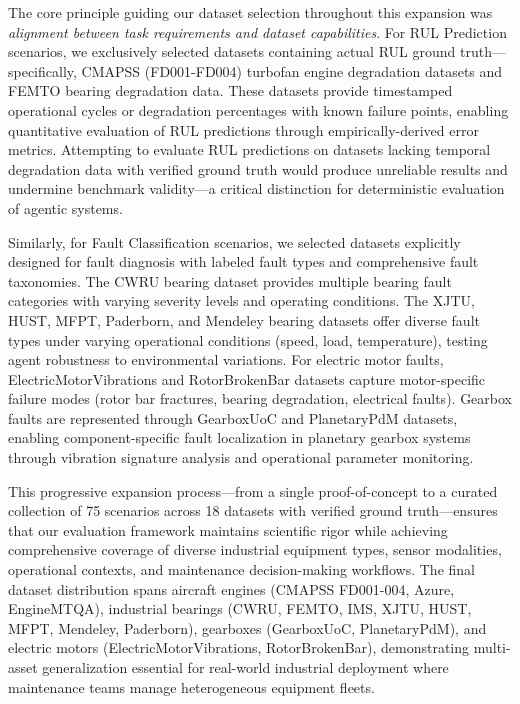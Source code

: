 \documentclass[sigconf]{acmart}
\begin{document}
The core principle guiding our dataset selection throughout this expansion was \textit{alignment between task requirements and dataset capabilities}. For RUL Prediction scenarios, we exclusively selected datasets containing actual RUL ground truth---specifically, CMAPSS (FD001-FD004) turbofan engine degradation datasets and FEMTO bearing degradation data. These datasets provide timestamped operational cycles or degradation percentages with known failure points, enabling quantitative evaluation of RUL predictions through empirically-derived error metrics. Attempting to evaluate RUL predictions on datasets lacking temporal degradation data with verified ground truth would produce unreliable results and undermine benchmark validity---a critical distinction for deterministic evaluation of agentic systems.

Similarly, for Fault Classification scenarios, we selected datasets explicitly designed for fault diagnosis with labeled fault types and comprehensive fault taxonomies. The CWRU bearing dataset provides multiple bearing fault categories with varying severity levels and operating conditions. The XJTU, HUST, MFPT, Paderborn, and Mendeley bearing datasets offer diverse fault types under varying operational conditions (speed, load, temperature), testing agent robustness to environmental variations. For electric motor faults, ElectricMotorVibrations and RotorBrokenBar datasets capture motor-specific failure modes (rotor bar fractures, bearing degradation, electrical faults). Gearbox faults are represented through GearboxUoC and PlanetaryPdM datasets, enabling component-specific fault localization in planetary gearbox systems through vibration signature analysis and operational parameter monitoring.

This progressive expansion process---from a single proof-of-concept to a curated collection of 75 scenarios across 18 datasets with verified ground truth---ensures that our evaluation framework maintains scientific rigor while achieving comprehensive coverage of diverse industrial equipment types, sensor modalities, operational contexts, and maintenance decision-making workflows. The final dataset distribution spans aircraft engines (CMAPSS FD001-004, Azure, EngineMTQA), industrial bearings (CWRU, FEMTO, IMS, XJTU, HUST, MFPT, Mendeley, Paderborn), gearboxes (GearboxUoC, PlanetaryPdM), and electric motors (ElectricMotorVibrations, RotorBrokenBar), demonstrating multi-asset generalization essential for real-world industrial deployment where maintenance teams manage heterogeneous equipment fleets.
\end{document}
